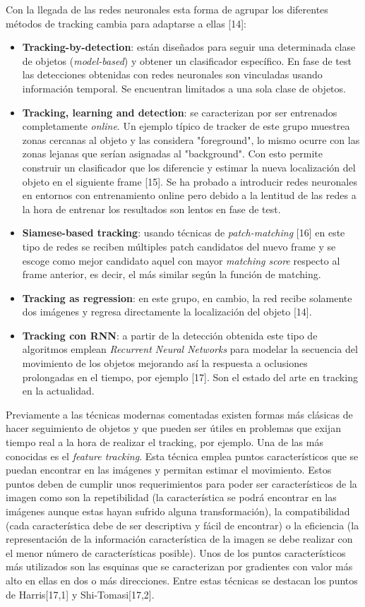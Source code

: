 \documentclass{bmvc2k}
\begin{document}
Con la llegada de las redes neuronales esta forma de agrupar los diferentes métodos de tracking cambia para adaptarse a ellas [14]:
\begin{itemize}
\item \textbf{Tracking-by-detection}: están diseñados para seguir una determinada clase de objetos (\textit{model-based}) y obtener un clasificador específico. En fase de test las detecciones obtenidas con redes neuronales son vinculadas usando información temporal. Se encuentran limitados a una sola clase de objetos.
\item \textbf{Tracking, learning and detection}: se caracterizan por ser entrenados completamente \textit{online}. Un ejemplo típico de tracker de este grupo muestrea zonas cercanas al objeto y las considera "foreground", lo mismo ocurre con las zonas lejanas que serían asignadas al "background". Con esto permite construir un clasificador que los diferencie y estimar la nueva localización del objeto en el siguiente frame [15]. Se ha probado a introducir redes neuronales en entornos con entrenamiento online pero debido a la lentitud de las redes a la hora de entrenar los resultados son lentos en fase de test.
\item \textbf{Siamese-based tracking}: usando técnicas de \textit{patch-matching} [16] en este tipo de redes se reciben múltiples patch candidatos del nuevo frame y se escoge como mejor candidato aquel con mayor \textit{matching score} respecto al frame anterior, es decir, el más similar según la función de matching.
\item \textbf{Tracking as regression}: en este grupo, en cambio, la red recibe solamente dos imágenes y regresa directamente la localización del objeto [14].
\item \textbf{Tracking con RNN}: a partir de la detección obtenida este tipo de algoritmos emplean \textit{Recurrent Neural Networks} para modelar la secuencia del movimiento de los objetos mejorando así la respuesta a oclusiones prolongadas en el tiempo, por ejemplo [17]. Son el estado del arte en tracking en la actualidad.
\end{itemize}
Previamente a las técnicas modernas comentadas existen formas más clásicas de hacer seguimiento de objetos y que pueden ser útiles en problemas que exijan tiempo real a la hora de realizar el tracking, por ejemplo. Una de las más conocidas es el \textit{feature tracking}. Esta técnica emplea puntos característicos que se puedan encontrar en las imágenes y permitan estimar el movimiento. Estos puntos deben de cumplir unos requerimientos para poder ser característicos de la imagen como son la repetibilidad (la característica se podrá encontrar en las imágenes aunque estas hayan sufrido alguna transformación), la compatibilidad (cada característica debe de ser descriptiva y fácil de encontrar) o la eficiencia (la representación de la información característica de la imagen se debe realizar con el menor número de características posible). Unos de los puntos característicos más utilizados son las esquinas que se caracterizan por gradientes con valor más alto en ellas en dos o más direcciones. Entre estas técnicas se destacan los puntos de Harris[17,1] y Shi-Tomasi[17,2].\\
\end{document}
